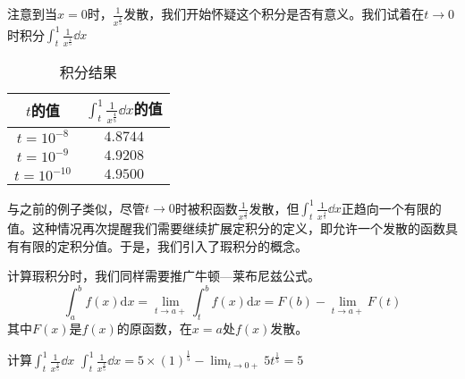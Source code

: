 注意到当$x=0$时，$\frac{1}{x^{\frac{4}{5}}}$发散，我们开始怀疑这个积分是否有意义。我们试着在$t\to0$时积分$\int_t^1 \frac{1}{x^{\frac{4}{5}}} \dd x$

\begin{table}[ht]
\centering
\caption{积分结果}\label{tab_impro_2}
\begin{tabular}{|c|c|}
\hline
$t$的值 & $\int_t^1 \frac{1}{x^{\frac{4}{5}}} \dd x$的值 \\
\hline
$t=10^{-8}$ & $4.8744$ \\
\hline
$t=10^{-9}$  & $4.9208$ \\
\hline
$t=10^{-10}$  & $4.9500$ \\
\hline
\end{tabular}
\end{table}
与之前的例子类似，尽管$t\to0$时被积函数$\frac{1}{x^{\frac{4}{5}}}$发散，但$\int_t^1 \frac{1}{x^{\frac{4}{5}}}\dd x$正趋向一个有限的值。这种情况再次提醒我们需要继续扩展定积分的定义，即允许一个发散的函数具有有限的定积分值。于是，我们引入了瑕积分的概念。


计算瑕积分时，我们同样需要推广牛顿—莱布尼兹公式。
\begin{equation}
\displaystyle \int ^{b}_a f(x)\mathrm{d} x=\lim_{t\rightarrow a+}\int _t^{b}f(x)\mathrm{d} x
= F(b) - \lim_{t\rightarrow a+ }F(t)
\end{equation}
其中$F(x)$是$f(x)$的原函数，在$x=a$处$f(x)$发散。

\begin{example}{计算$\int_t^1 \frac{1}{x^{\frac{4}{5}}}\dd x$}
$\int_t^1 \frac{1}{x^{\frac{4}{5}}}\dd x = 5\times(1)^{\frac{1}{5}} - \lim_{t\rightarrow 0+ }5t^{\frac{1}{5}}=5$
\end{example}

